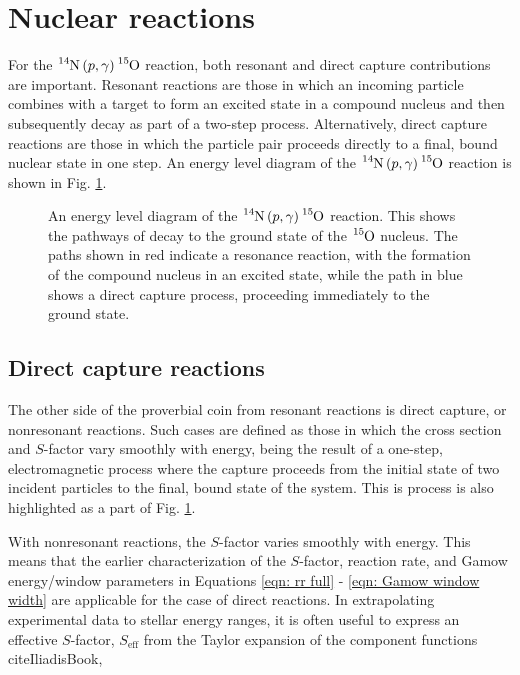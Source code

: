 \section{Nuclear reactions}
\label{sec: reactions}

For the $\ce{^{14}N} \left( p, \gamma \right) \ce{^{15}O}$ reaction, both resonant and direct capture contributions are important. Resonant reactions are those in which an incoming particle combines with a target to form an excited state in a compound nucleus and then subsequently decay as part of a two-step process. Alternatively, direct capture reactions are those in which the particle pair proceeds directly to a final, bound nuclear state in one step. An energy level diagram of the $\ce{^{14}N} \left( p, \gamma \right) \ce{^{15}O}$ reaction is shown in Fig. \ref{fig: level diagram}.

\begin{figure}
\label{fig: level diagram}
\caption{An energy level diagram of the $\ce{^{14}N} \left( p, \gamma \right) \ce{^{15}O}$ reaction. This shows the pathways of decay to the ground state of the $\ce{^{15}O}$ nucleus. The paths shown in  red indicate a resonance reaction, with the formation of the compound nucleus in an excited state, while the path in blue shows a direct capture process, proceeding immediately to the ground state.}
\end{figure}




\subsection{Direct capture reactions}

The other side of the proverbial coin from resonant reactions is direct capture, or nonresonant reactions. Such cases are defined as those in which the cross section and $S$-factor vary smoothly with energy, being the result of a one-step, electromagnetic process where the capture proceeds from the initial state of two incident particles to the final, bound state of the system. This is process is also highlighted as a part of Fig. \ref{fig: level diagram}. 

With nonresonant reactions, the $S$-factor varies smoothly with energy. This means that the earlier characterization  of the $S$-factor, reaction rate, and Gamow energy/window parameters in Equations \ref{eqn: rr full} - 
\ref{eqn: Gamow window width} are applicable for the case of direct reactions. In extrapolating experimental data to stellar energy ranges, it is often useful to express an effective $S$-factor, $S_{\text{eff}}$ from the Taylor expansion of the component functions cite{IliadisBook},

